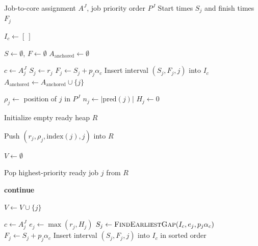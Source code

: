 \documentclass{article}
\begin{document}
\begin{algorithm}[H]
    \caption{Build Schedule from Job Assignment and Job Priority Order}
    \label{alg:build_schedule}
    \begin{algorithmic}[1]
        \Require Job-to-core assignment $A^J$, job priority order $P^J$
        \Ensure Start times $S_j$ and finish times $F_j$

            \State $I_c \gets [\ ]$
        \EndFor

        \State $S \gets \emptyset$, $F \gets \emptyset$
        \State $A_{\mathrm{anchored}} \gets \emptyset$

        \Statex
                    \State $c \gets A^J_j$
                    \State $S_j \gets r_j$
                    \State $F_j \gets S_j + p_j \alpha_c$
                    \State Insert interval $(S_j,F_j,j)$ into $I_c$
                    \State $A_{\mathrm{anchored}} \gets A_{\mathrm{anchored}} \cup \{j\}$
                \EndIf
            \EndFor
        \EndIf

        \Statex
            \State $\rho_j \gets$ position of $j$ in $P^J$
            \State $n_j \gets |\mathrm{pred}(j)|$
            \State $H_j \gets 0$
        \EndFor

        \State Initialize empty ready heap $R$

                \State Push $(r_j,\rho_j,\mathrm{index}(j),j)$ into $R$
            \EndIf
        \EndFor

        \State $V \gets \emptyset$

            \State Pop highest-priority ready job $j$ from $R$

                \State \textbf{continue}
            \EndIf

            \State $V \gets V \cup \{j\}$

                \State $c \gets A^J_j$
                \State $e_j \gets \max(r_j,H_j)$
                \State $S_j \gets \Call{FindEarliestGap}{I_c,e_j,p_j\alpha_c}$
                \State $F_j \gets S_j + p_j\alpha_c$
                \State Insert interval $(S_j,F_j,j)$ into $I_c$ in sorted order
            \EndIf


\end{algorithmic}
\end{algorithm}
\end{document}
